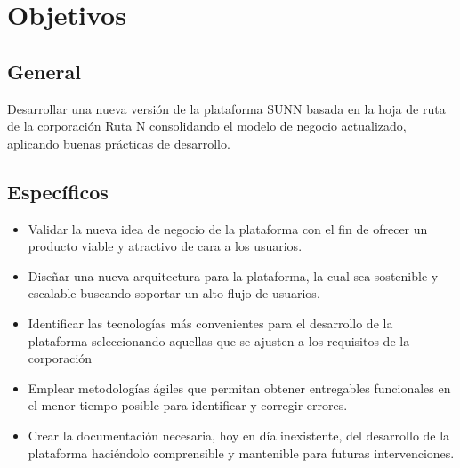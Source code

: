 \onehalfspacing
\chapter*{Objetivos}
\section*{General}
Desarrollar  una  nueva  versión  de  la  plataforma  SUNN basada en la hoja de ruta de la corporación Ruta N consolidando el modelo de negocio actualizado, aplicando buenas prácticas de desarrollo.

\section*{Específicos}
\begin{itemize}
	\item Validar la nueva idea de negocio de la plataforma con el fin de ofrecer un producto viable y atractivo de cara a los usuarios.
	
	\item Diseñar una nueva arquitectura para la plataforma, la cual sea sostenible y escalable buscando soportar un alto flujo de usuarios.
	
	\item Identificar las tecnologías más convenientes para el desarrollo de la plataforma seleccionando aquellas que se ajusten a los requisitos de la corporación
	
	\item Emplear metodologías ágiles que permitan obtener entregables funcionales en el menor tiempo posible para identificar y corregir errores.
	
	\item Crear la documentación necesaria, hoy en día inexistente, del desarrollo de la plataforma haciéndolo comprensible y mantenible para futuras intervenciones.
\end{itemize}